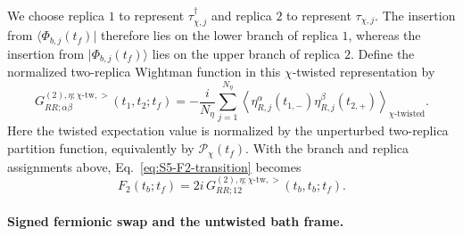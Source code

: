 \documentclass[11pt,a4paper]{article}
\begin{document}
We choose replica \(1\) to represent
\(\tau_{\chi,j}^{\dagger}\) and replica \(2\) to represent
\(\tau_{\chi,j}\). The insertion from
\(\langle\Phi_{b,j}(t_f)\rvert\) therefore lies on the lower branch of
replica \(1\), whereas the insertion from
\(\lvert\Phi_{b,j}(t_f)\rangle\) lies on the upper branch of replica \(2\).
Define the normalized two-replica Wightman function in this
\(\chi\)-twisted representation by
\begin{equation}
  G^{(2),\eta;\chi\text{-tw},>}_{RR;\alpha\beta}
  (t_1,t_2;t_f)
  =
  -\frac{i}{N_\eta}
  \sum_{j=1}^{N_\eta}
  \left\langle
  \eta^\alpha_{R,j}(t_{1,-})
  \eta^\beta_{R,j}(t_{2,+})
  \right\rangle_{\chi\text{-twisted}} .
\label{eq:S5-two-replica-greater}
\end{equation}
Here the twisted expectation value is normalized by the unperturbed
two-replica partition function, equivalently by
\(\mathcal P_\chi(t_f)\). With the branch and replica assignments above,
Eq.~\eqref{eq:S5-F2-transition} becomes
\begin{equation}
  F_2(t_b;t_f)
  =
  2i\,
  G^{(2),\eta;\chi\text{-tw},>}_{RR;12}
  (t_b,t_b;t_f).
\label{eq:S5-F2-green}
\end{equation}

\paragraph*{Signed fermionic swap and the untwisted bath frame.}
\end{document}
